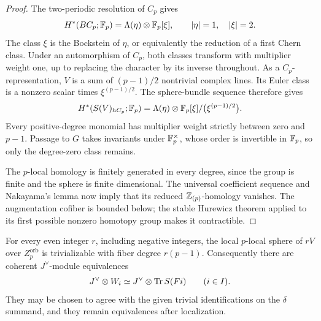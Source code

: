 \begin{proof}
The two-periodic resolution of $C_p$ gives
\[
 H^*(BC_p;\mathbb F_p)=\Lambda(\eta)\otimes\mathbb F_p[\xi],
 \qquad |\eta|=1,\quad |\xi|=2.
\]
The class $\xi$ is the Bockstein of $\eta$, or equivalently the
reduction of a first Chern class. Under an automorphism of $C_p$,
both classes transform with multiplier weight one, up to replacing
the character by its inverse throughout. As a $C_p$-representation,
$V$ is a sum of $(p-1)/2$ nontrivial complex lines. Its Euler class
is a nonzero scalar times $\xi^{(p-1)/2}$. The sphere-bundle sequence
therefore gives
\[
 H^*(S(V)_{hC_p};\mathbb F_p)
 =\Lambda(\eta)\otimes
 \mathbb F_p[\xi]/\bigl(\xi^{(p-1)/2}\bigr).
\]
Every positive-degree monomial has multiplier weight strictly between
zero and $p-1$. Passage to $G$ takes invariants under
$\mathbb F_p^\times$, whose order is invertible in $\mathbb F_p$, so only the
degree-zero class remains.

The $p$-local homology is finitely generated in every degree, since
the group is finite and the sphere is finite dimensional. The
universal coefficient sequence and Nakayama's lemma now imply that
its reduced $\mathbb Z_{(p)}$-homology vanishes. The augmentation cofiber is
bounded below; the stable Hurewicz theorem applied to its first
possible nonzero homotopy group makes it contractible.
\end{proof}

\begin{lemma}
\label{layer:even-trivializations}
For every even integer $r$, including negative integers, the local
$p$-local sphere of $rV$ over $Z_p^{\mathrm{orb}}$ is trivializable
with fiber degree $r(p-1)$. Consequently there are coherent
$J^\vee$-module equivalences
\begin{equation}
 \label{layer:oriented-W}
 J^\vee\otimes W_i\simeq
 J^\vee\otimes\operatorname{Tr} S(Fi)
 \qquad(i\in I).
\end{equation}
They may be chosen to agree with the given trivial identifications
on the $\delta$ summand, and they remain equivalences after
localization.
\end{lemma}

